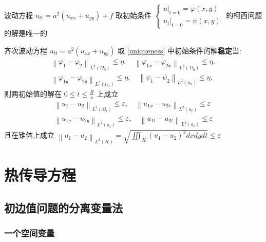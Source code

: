 \documentclass[10pt]{yerbaformat}
\begin{document}
\begin{theorem}
    波动方程 $u_{tt}=a^{2}\left(u_{xx}+u_{y y}\right)+f$ 取初始条件 $\left\{\begin{array}{l}\left.u\right|_{t=0}=\varphi(x, y) \\ \left.u_{t}\right|_{t=0}=\psi(x, y)\end{array}\right.$ 的柯西问题的解是唯一的 \label{uniqueness}
\end{theorem}

\begin{theorem}
    齐次波动方程 $u_{tt}=a^{2}\left(u_{xx}+u_{y y}\right)$ 取 \ref{uniqueness} 中初始条件的解\textbf{稳定}当:
    $$
        \begin{array}{l}
            \left\|\varphi_{1}-\varphi_{2}\right\|_{L^{2}\left(\Omega_{0}\right)} \leqslant \eta, \quad\left\|\varphi_{1 x}-\varphi_{2 x}\right\|_{L^{2}\left(\Omega_{0}\right)} \leqslant \eta, \\
            \left\|\varphi_{1 y}-\varphi_{2 y}\right\|_{L^{2}\left(n_{0}\right)} \leqslant \eta, \quad\left\|\psi_{1}-\psi_{2}\right\|_{L^{2}\left(n_{0}\right)} \leqslant \eta,
        \end{array}
    $$
    则两初始值的解在 $0 \leqslant t \leqslant \frac{R}{a}$ 上成立
    $$
        \begin{array}{l}
            \left\|u_{1}-u_{2}\right\|_{L^{2}\left(\Omega_{t}\right)} \leqslant \varepsilon, \quad\left\|u_{1 x}-u_{2 r}\right\|_{L^{2}\left(a_{t}\right)} \leqslant \varepsilon \\
            \left\|u_{1 y}-u_{2 y}\right\|_{L^{2}\left(a_{t}\right)} \leqslant \varepsilon, \quad\left\|u_{1 t}-u_{2 t}\right\|_{L^{2}\left(a_{t}\right)} \leqslant \varepsilon
        \end{array}
    $$
    且在锥体上成立 $\left\|u_{1}-u_{2}\right\|_{L^{2}(K)}=\sqrt{\iiint_{K}\left(u_{1}-u_{2}\right)^{2} d x d y d t} \leqslant \varepsilon$
\end{theorem}

\section{热传导方程}

\subsection{初边值问题的分离变量法}
\subsubsection*{一个空间变量}
\end{document}
